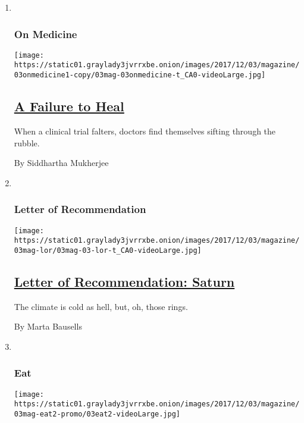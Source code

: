 \begin{enumerate}
\def\labelenumi{\arabic{enumi}.}
\item ~
  \hypertarget{on-medicine}{%
  \subsubsection{On Medicine}\label{on-medicine}}

  \texttt{[image: https://static01.graylady3jvrrxbe.onion/images/2017/12/03/magazine/03onmedicine1-copy/03mag-03onmedicine-t\_CA0-videoLarge.jpg]}

  \hypertarget{a-failure-to-heal}{%
  \subsection{\texorpdfstring{\href{/2017/11/28/magazine/a-failure-to-heal.html}{A
  Failure to Heal}}{A Failure to Heal}}\label{a-failure-to-heal}}

  When a clinical trial falters, doctors find themselves sifting through
  the rubble.

  By Siddhartha Mukherjee
\item ~
  \hypertarget{letter-of-recommendation}{%
  \subsubsection{Letter of
  Recommendation}\label{letter-of-recommendation}}

  \texttt{[image: https://static01.graylady3jvrrxbe.onion/images/2017/12/03/magazine/03mag-lor/03mag-03-lor-t\_CA0-videoLarge.jpg]}

  \hypertarget{letter-of-recommendation-saturn}{%
  \subsection{\texorpdfstring{\href{/2017/11/30/magazine/letter-of-recommendation-saturn.html}{Letter
  of Recommendation:
  Saturn}}{Letter of Recommendation: Saturn}}\label{letter-of-recommendation-saturn}}

  The climate is cold as hell, but, oh, those rings.

  By Marta Bausells
\item ~
  \hypertarget{eat}{%
  \subsubsection{Eat}\label{eat}}

  \texttt{[image: https://static01.graylady3jvrrxbe.onion/images/2017/12/03/magazine/03mag-eat2-promo/03eat2-videoLarge.jpg]}


\end{enumerate}
